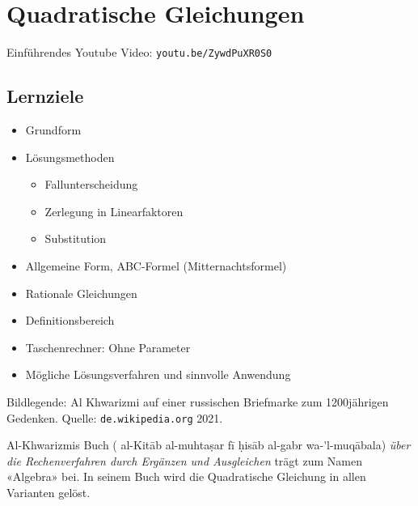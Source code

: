 \section{Quadratische Gleichungen}


Einführendes Youtube Video: \texttt{youtu.be/ZywdPuXR0S0}

\subsection*{Lernziele}

\begin{itemize}
\item Grundform
\item Lösungsmethoden
  \begin{itemize}
    \item{Fallunterscheidung}
    \item{Zerlegung in Linearfaktoren}
    \item{Substitution}
  \end{itemize}
\item Allgemeine Form, ABC-Formel (Mitternachtsformel)
\item Rationale Gleichungen
\item Definitionsbereich
\item Taschenrechner: Ohne Parameter
\item Mögliche Lösungsverfahren und sinnvolle Anwendung
\end{itemize}
\newpage


Bildlegende: Al Khwarizmi auf einer russischen Briefmarke zum
1200jährigen Gedenken. Quelle: \texttt{de.wikipedia.org} 2021.


Al-Khwarizmis Buch (
al-Kit\={a}b al-muhta\d{s}ar f\={i} \d{h}is\={a}b al-gabr wa-\'{}l-muq\={a}bala) \textit{über die Rechenverfahren durch Ergänzen und
Ausgleichen} trägt zum Namen «Algebra» bei. In seinem Buch wird die
Quadratische Gleichung in allen Varianten gelöst.

